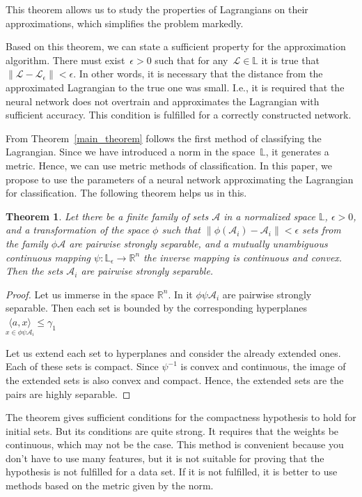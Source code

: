 \documentclass[12pt]{paper}
\newtheorem{theorem}{Theorem}
\newtheorem{proof}{Proof}
\begin{document}
This theorem allows us to study the properties of Lagrangians on their approximations,
which simplifies the problem markedly.

Based on this theorem, we can state a sufficient property for the approximation algorithm.
There must exist~$\epsilon > 0$ such that for any~$\mathcal{L} \in \mathbb{L}$ it is true that~$\|\mathcal{L}- \mathcal{L}_{\epsilon}\| < \epsilon$. In other words, it is necessary that the distance from the approximated Lagrangian to the true one was small. I.e., it is required that the neural network does not overtrain and approximates the Lagrangian with sufficient accuracy. This condition is fulfilled for a correctly constructed network.

From Theorem~\ref{main_theorem} follows the first method of classifying the Lagrangian. Since we have introduced a norm in the space~$\mathbb{L}$, it generates a metric. Hence, we can use metric methods of classification. In this paper, we propose to use the parameters of a neural network approximating the Lagrangian for classification. The following theorem helps us in this.

\begin{theorem} \label{r_theorem}
Let there be a finite family of sets $\mathcal{A}$ in a normalized space $\mathbb{L}$, $\epsilon > 0$, and a transformation of the space $\phi$ such that $\|\phi(\mathcal{A}_{i}) - \mathcal{A}_{i}\| < \epsilon$ sets from the family $\phi{\mathcal{A}}$ are pairwise
strongly separable, and a mutually unambiguous continuous mapping $\psi: \mathbb{L}_{\epsilon} \rightarrow \mathbb{R}^{n}$ the inverse mapping is continuous and convex. Then the sets $\mathcal{A}_{i}$ are pairwise strongly separable.
\end{theorem}

\begin{proof}
Let us immerse in the space $\mathbb{R}^{n}$. In it $\phi\psi \mathcal{A}_{i}$ are pairwise strongly separable. Then each set is bounded by the corresponding hyperplanes $\underset{x \in \phi\psi\mathcal{A}_{i}}{\langle a, x \rangle}\leq \gamma_{1}$

Let us extend each set to hyperplanes and consider the already extended ones. Each of these
sets is compact. Since $\psi^{-1}$ is convex and continuous, the image of the extended sets is also convex and compact. Hence, the extended sets are the pairs are highly separable.
\end{proof}

The theorem gives sufficient conditions for the compactness hypothesis to hold for initial
sets. But its conditions are quite strong. It requires that the weights be continuous, which may
not be the case. This method is convenient because you don't have to use many features, but it
is not suitable for proving that the hypothesis is not fulfilled for a data set. If it is not fulfilled, it is better to use methods based on the metric given by the norm.
\end{document}
